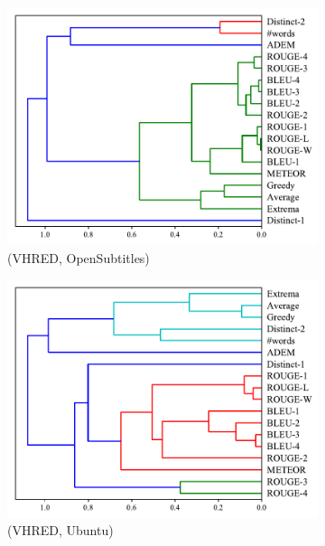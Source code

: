 \begin{figure}[htb]
\begin{subfigure}{0.35\linewidth}
        \includegraphics[width=\linewidth]{figure/plot/hierarchy/v3/pearson/vhred/opensub/plot.pdf}
        \caption{(VHRED, OpenSubtitles)}
    \end{subfigure}%
    \begin{subfigure}{0.35\linewidth}
        \centering
        \includegraphics[width=\linewidth]{figure/plot/hierarchy/v3/pearson/vhred/ubuntu/plot.pdf}
        \caption{(VHRED, Ubuntu)}
    \end{subfigure}
    \begin{subfigure}{0.35\linewidth}
        \centering

\end{subfigure}
\end{figure}
